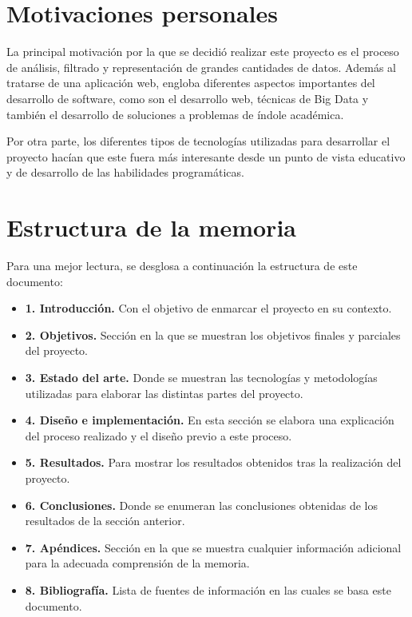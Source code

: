 \documentclass[a4paper, spanish, 12pt]{book}
\begin{document}
\section{Motivaciones personales}
\label{sec:motivaciones}

La principal motivaci\'on por la que se decidi\'o realizar este proyecto es el
proceso de an\'alisis, filtrado y representaci\'on de grandes cantidades de datos.
Adem\'as al tratarse de una aplicaci\'on web, engloba diferentes
aspectos importantes del desarrollo de software, como son el desarrollo web,
t\'ecnicas de Big Data y tambi\'en el desarrollo de soluciones a problemas de
\'indole acad\'emica.

Por otra parte, los diferentes tipos de tecnolog\'ias utilizadas para desarrollar
el proyecto hac\'ian que este fuera m\'as interesante desde un punto de vista
educativo y de desarrollo de las habilidades program\'aticas.

\section{Estructura de la memoria}
\label{sec:estructura}

Para una mejor lectura, se desglosa a continuaci\'on la estructura de este documento:

\begin{itemize}
  \item \textbf{1. Introducci\'on.} Con el objetivo de enmarcar el proyecto en
  su contexto.

  \item \textbf{2. Objetivos.} Secci\'on en la que se muestran los objetivos
  finales y parciales del proyecto.

  \item \textbf{3. Estado del arte.} Donde se muestran las tecnolog\'ias y metodolog\'ias
  utilizadas para elaborar las distintas partes del proyecto.

  \item \textbf{4. Dise\~no e implementaci\'on.} En esta secci\'on se elabora una
  explicaci\'on del proceso realizado y el dise\~no previo a este proceso.

  \item \textbf{5. Resultados.} Para mostrar los resultados obtenidos tras la realizaci\'on
  del proyecto.

  \item \textbf{6. Conclusiones.} Donde se enumeran las conclusiones obtenidas de
  los resultados de la secci\'on anterior.

  \item \textbf{7. Ap\'endices.} Secci\'on en la que se muestra cualquier informaci\'on
  adicional para la adecuada comprensi\'on de la memoria.

  \item \textbf{8. Bibliograf\'ia.} Lista de fuentes de informaci\'on en las cuales
  se basa este documento.
\end{itemize}
\end{document}
